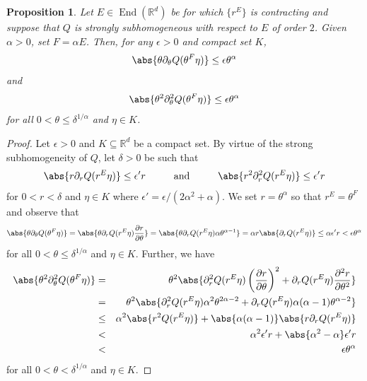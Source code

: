 \documentclass[11pt, letter]{book}
\newtheorem{proposition}[theorem]{Proposition}
\newcommand\End{\operatorname{End}} %
\begin{document}
\begin{framed}
\begin{proposition}\label{prop:2StronglySubhomogeneous}
Let $E\in\End(\mathbb{R}^d)$ be for which $\{r^E\}$ is contracting and suppose that $Q$ is strongly subhomogeneous with respect to $E$ of order $2$. Given $\alpha>0$, set $F=\alpha E$. Then, for any $\epsilon>0$ and compact set $K$,
\begin{equation*}
    \abs{\theta\partial_\theta Q(\theta^F\eta)}\leq \epsilon \theta^\alpha
\end{equation*}
and
\begin{equation*}
    \abs{\theta^2\partial_\theta^2 Q(\theta^F\eta)}\leq \epsilon \theta^\alpha
\end{equation*}
for all $0<\theta\leq \delta^{1/\alpha}$ and $\eta\in K$.
\end{proposition}
\end{framed}
\begin{proof}
Let $\epsilon>0$ and $K\subseteq\mathbb{R}^d$ be a compact set. By virtue of the strong subhomogeneity of $Q$, let $\delta>0$ be such that
\begin{equation*}
    \abs{r\partial_r Q(r^E\eta)}\leq \epsilon' r\hspace{1cm}\mbox{and}\hspace{1cm}\abs{r^2\partial_r^2Q(r^E\eta)}\leq \epsilon' r
\end{equation*}
for $0<r<\delta$ and $\eta\in K$ where $\epsilon'=\epsilon/(2\alpha^2+\alpha)$. We set $r=\theta^\alpha$ so that $r^E=\theta^F$ and observe that
\begin{equation*}
    \abs{\theta\partial_\theta Q(\theta^F\eta)}=\abs{\theta\partial_rQ(r^E\eta)\frac{\partial r}{\partial\theta}}= \abs{\theta\partial_rQ(r^E\eta)\alpha \theta^{\alpha-1}}=\alpha r\abs{\partial_rQ(r^E\eta)}\leq \alpha\epsilon' r<\epsilon \theta^\alpha
\end{equation*}
for all $0<\theta\leq \delta^{1/\alpha}$ and $\eta\in K$. Further, we have
\begin{eqnarray*}
    \abs{\theta^2\partial_\theta^2Q(\theta^F\eta)}&=&\theta^2\abs{\partial_r^2Q(r^E\eta)\left(\frac{\partial r}{\partial\theta}\right)^2+\partial_r Q(r^E\eta)\frac{\partial^2 r}{\partial \theta^2}}\\
    &=&\theta^2\abs{\partial_r^2 Q(r^E\eta) \alpha^2\theta^{2\alpha-2}+\partial_r Q(r^E\eta)\alpha(\alpha-1)\theta^{\alpha-2}}\\
    &\leq &\alpha^2\abs{r^2Q(r^E\eta)}+\abs{\alpha(\alpha-1)}\abs{r\partial_r Q(r^E\eta)}\\
    &< &\alpha^2 \epsilon' r+\abs{\alpha^2-\alpha}\epsilon' r\\
    &<&\epsilon\theta^\alpha
\end{eqnarray*}
for all $0<\theta<\delta^{1/\alpha}$ and $\eta\in K$.
\end{proof}
\end{document}
